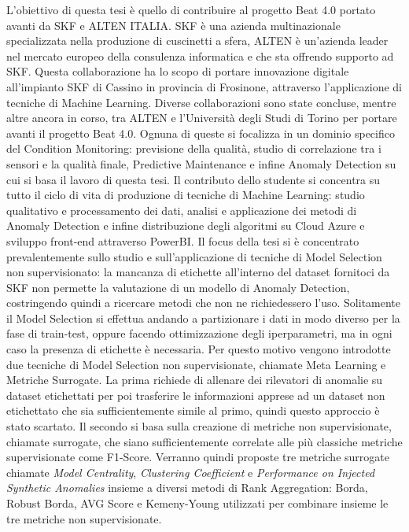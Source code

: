 L’obiettivo di questa tesi è quello di contribuire al progetto Beat 4.0 portato avanti da SKF e ALTEN ITALIA. SKF è una azienda multinazionale specializzata nella produzione di cuscinetti a sfera, ALTEN è un'azienda leader nel mercato europeo della consulenza informatica e che sta offrendo supporto ad SKF. Questa collaborazione ha lo scopo di portare innovazione digitale all'impianto SKF di Cassino in provincia di Frosinone, attraverso l'applicazione di tecniche di Machine Learning.
Diverse collaborazioni sono state concluse, mentre altre ancora in corso, tra ALTEN e l'Università degli Studi di Torino per portare avanti il progetto Beat 4.0. Ognuna di queste si focalizza in un dominio specifico del Condition Monitoring: previsione della qualità, studio di correlazione tra i sensori e la qualità finale, Predictive Maintenance e infine Anomaly Detection su cui si basa il lavoro di questa tesi.
Il contributo dello studente si concentra su tutto il ciclo di vita di produzione di tecniche di Machine Learning: studio qualitativo e processamento dei dati, analisi e applicazione dei metodi di Anomaly Detection e infine distribuzione degli algoritmi su Cloud Azure e sviluppo front-end attraverso PowerBI.
Il focus della tesi si è concentrato prevalentemente sullo studio e sull'applicazione di tecniche di Model Selection non supervisionato: la mancanza di etichette all'interno del dataset fornitoci da SKF non permette la valutazione di un modello di Anomaly Detection, costringendo quindi a ricercare metodi che non ne richiedessero l'uso. Solitamente il Model Selection si effettua andando a partizionare i dati in modo diverso per la fase di train-test, oppure facendo ottimizzazione degli iperparametri, ma in ogni caso la presenza di etichette è necessaria. Per questo motivo vengono introdotte due tecniche di Model Selection non supervisionate, chiamate Meta Learning e Metriche Surrogate. La prima richiede di allenare dei rilevatori di anomalie su dataset etichettati per poi trasferire le informazioni apprese ad un dataset non etichettato che sia sufficientemente simile al primo, quindi questo approccio è stato scartato. Il secondo si basa sulla creazione di metriche non supervisionate, chiamate surrogate, che siano sufficientemente correlate alle più classiche metriche supervisionate come F1-Score. Verranno quindi proposte tre metriche surrogate chiamate \textit{Model Centrality}, \textit{Clustering Coefficient} e \textit{Performance on Injected Synthetic Anomalies} insieme a diversi metodi di Rank Aggregation: Borda, Robust Borda, AVG Score e Kemeny-Young utilizzati per combinare insieme le tre metriche non supervisionate.

